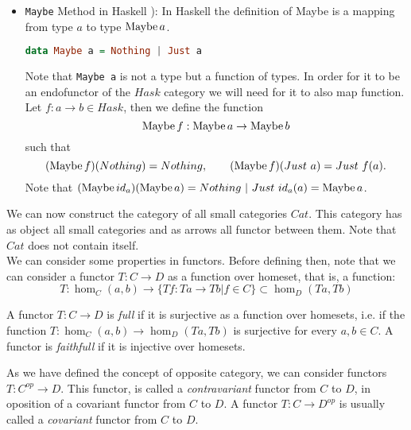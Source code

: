 \begin{example}
\begin{itemize}
\item \texttt{Maybe} Method in Haskell \cite[Section 7.1]{milewski2018category}): In Haskell the definition of Maybe is a mapping from type $a$ to type $\operatorname{Maybe}  a$.
  
\begin{lstlisting}[language=Haskell,caption={Declaration of Maybe},captionpos=b]
         data Maybe a = Nothing | Just a
       \end{lstlisting}

       Note that \texttt{Maybe a} is not a type but a function of types. In order for it to be an endofunctor of the $Hask$ category we will need for it to also map function. Let $f: a \to b\in Hask$, then we define the function
       $$\operatorname{Maybe}  f: \operatorname{Maybe} a \to \operatorname{Maybe} b$$
such that
$$(\operatorname{Maybe}  f) (Nothing) = Nothing, \qquad (\operatorname{Maybe} f) (Just\  a) = Just\  f(a).$$
Note that $(\operatorname{Maybe} id_a) (\operatorname{Maybe} a) = Nothing\  |\  Just\  id_a(a) =  \operatorname{Maybe} a$.
     \end{itemize}
\end{example}


We can now construct the category of all small categories $Cat$. This category has as object all small categories and as arrows all functor between them. Note that $Cat$ does not contain itself.\\

We can consider some properties in functors. Before defining then, note that we can consider a functor $T:C\to D$ as a function over homeset, that is, a function: 
$$T:\hom_C(a,b) \to \{Tf: Ta \to Tb | f \in C\} \subset \hom_D(Ta,Tb)$$

\begin{definition}
  A functor $T:C\to D$ is \emph{full} if it is surjective as a function over homesets, i.e. if the function $T:\hom_C(a,b) \to  \hom_D(Ta,Tb)$  is surjective for every $a,b \in C$. A functor is \emph{faithfull} if it is injective over homesets.
\end{definition}

As we have defined the concept of opposite category, we can consider functors $T:C^{op} \to D$. This functor, is called a \emph{contravariant} functor from $C$ to $D$, in oposition of a covariant functor from $C$ to $D$. A functor $T: C \to D^{op}$ is usually called a \emph{covariant} functor from $C$ to $D$.\\





